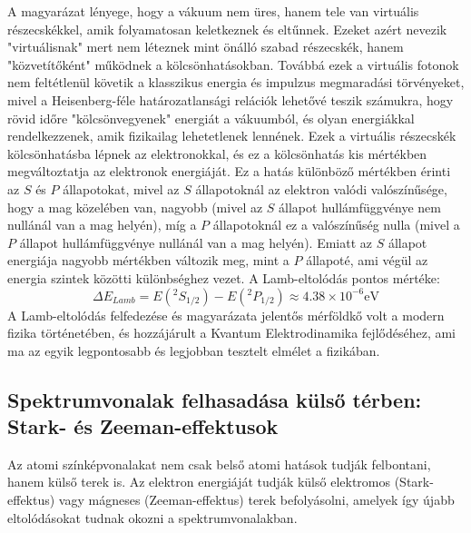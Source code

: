 \documentclass[../main.tex]{subfiles}
\begin{document}
A magyarázat lényege, hogy a vákuum nem üres, hanem tele van virtuális részecskékkel, amik folyamatosan keletkeznek és eltűnnek. Ezeket azért nevezik "virtuálisnak" mert nem léteznek mint önálló szabad részecskék, hanem
"közvetítőként" működnek a kölcsönhatásokban. Továbbá ezek a virtuális fotonok nem feltétlenül követik a klasszikus energia és impulzus megmaradási törvényeket, mivel a Heisenberg-féle határozatlansági relációk lehetővé teszik számukra, hogy rövid időre "kölcsönvegyenek" energiát a vákuumból, és olyan energiákkal rendelkezzenek, amik fizikailag lehetetlenek lennének.
Ezek a virtuális részecskék kölcsönhatásba lépnek az elektronokkal, és ez a kölcsönhatás kis mértékben megváltoztatja az elektronok energiáját. Ez a hatás különböző mértékben érinti az $S$ és $P$ állapotokat, mivel az $S$ állapotoknál az elektron valódi valószínűsége, hogy a mag közelében van, nagyobb
(mivel az $S$ állapot hullámfüggvénye nem nullánál van a mag helyén), míg a $P$ állapotoknál ez a valószínűség nulla (mivel a $P$ állapot hullámfüggvénye nullánál van a mag helyén). Emiatt az $S$ állapot energiája nagyobb mértékben változik meg, mint a $P$ állapoté, ami végül az energia szintek közötti különbséghez vezet.
A Lamb-eltolódás pontos mértéke:
\begin{equation}
    \Delta E_{Lamb} = E(^2S_{1/2}) - E(^2P_{1/2}) \approx 4.38 \times 10^{-6} \text{eV}
\end{equation}
A Lamb-eltolódás felfedezése és magyarázata jelentős mérföldkő volt a modern fizika történetében, és hozzájárult a Kvantum Elektrodinamika fejlődéséhez, ami ma az egyik legpontosabb és legjobban tesztelt elmélet a fizikában.

\subsection{Spektrumvonalak felhasadása külső térben: Stark- és Zeeman-effektusok}
Az atomi színképvonalakat nem csak belső atomi hatások tudják felbontani, hanem külső terek is. Az elektron energiáját tudják külső elektromos (Stark-effektus) vagy mágneses (Zeeman-effektus) terek befolyásolni,
amelyek így újabb eltolódásokat tudnak okozni a spektrumvonalakban.
\end{document}
